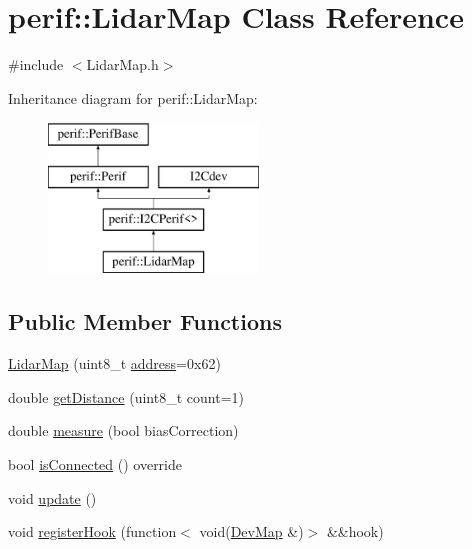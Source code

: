 \hypertarget{classperif_1_1LidarMap}{}\section{perif\+::Lidar\+Map Class Reference}
\label{classperif_1_1LidarMap}


{\ttfamily \#include $<$Lidar\+Map.\+h$>$}

Inheritance diagram for perif\+::Lidar\+Map\+:\begin{figure}[H]
\begin{center}
\leavevmode
\includegraphics[height=4.000000cm]{classperif_1_1LidarMap}
\end{center}
\end{figure}
\subsection*{Public Member Functions}
\begin{DoxyCompactItemize}
\item 
\mbox{\hyperlink{classperif_1_1LidarMap_a71c6c227c929dcefebd8055dc00084c1}{Lidar\+Map}} (uint8\+\_\+t \mbox{\hyperlink{classperif_1_1I2CPerif_a3275bcc89b3d8ddfa221fb76669c2d45}{address}}=0x62)
\item 
double \mbox{\hyperlink{classperif_1_1LidarMap_a7e7bc5c72157dcaccb282004528ffdcf}{get\+Distance}} (uint8\+\_\+t count=1)
\item 
double \mbox{\hyperlink{classperif_1_1LidarMap_a9a1d5acddce6e370e35219a6edf771cc}{measure}} (bool bias\+Correction)
\item 
bool \mbox{\hyperlink{classperif_1_1I2CPerif_aa8741297b2f5f9a0242806afa26b7361}{is\+Connected}} () override
\item 
void \mbox{\hyperlink{classperif_1_1Perif_ad6fe1a13354bba4af4cc2751399ed93c}{update}} ()
\item 
void \mbox{\hyperlink{classperif_1_1PerifBase_a2e8bcc221ee253b21b61c7c07307d931}{register\+Hook}} (function$<$ void(\mbox{\hyperlink{Perif_8hpp_a358ff4ee6d24694ee7661f0cce14377e}{Dev\+Map}} \&)$>$ \&\&hook)
\end{DoxyCompactItemize}
